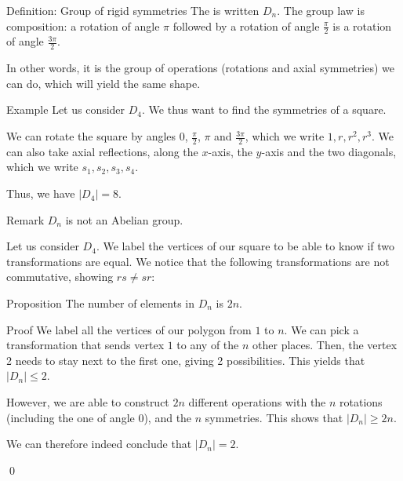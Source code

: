 \documentclass[a4paper]{article}
\begin{document}
\begin{parag}{Definition: Group of rigid symmetries}
    The  is written $D_n$. The group law is composition: a rotation of angle $\pi$ followed by a rotation of angle $\frac{\pi}{2}$ is a rotation of angle $\frac{3\pi}{2}$.

    In other words, it is the group of operations (rotations and axial symmetries) we can do, which will yield the same shape.
\end{parag}

\begin{parag}{Example}
    Let us consider $D_4$. We thus want to find the symmetries of a square.

    We can rotate the square by angles $0$, $\frac{\pi}{2}$, $\pi$ and $\frac{3\pi}{2}$, which we write $1, r, r^2, r^3$. We can also take axial reflections, along the $x$-axis, the $y$-axis and the two diagonals, which we write $s_1, s_2, s_3, s_4$.

    Thus, we have $\left|D_4\right| = 8$.
\end{parag}

\begin{parag}{Remark}
    $D_n$ is not an Abelian group.

    Let us consider $D_4$. We label the vertices of our square to be able to know if two transformations are equal. We notice that the following transformations are not commutative, showing $rs \neq sr$:
\end{parag}

\begin{parag}{Proposition}
    The number of elements in $D_n$ is $2n$.

    \begin{subparag}{Proof}
        We label all the vertices of our polygon from $1$ to $n$. We can pick a transformation that sends vertex $1$ to any of the $n$ other places. Then, the vertex 2 needs to stay next to the first one, giving 2 possibilities. This yields that $\left|D_n\right| \leq 2$.

        However, we are able to construct $2n$ different operations with the $n$ rotations (including the one of angle 0), and the $n$ symmetries. This shows that $\left|D_n\right| \geq 2n$.

        We can therefore indeed conclude that $\left|D_n\right|= 2$.

        \qed
    \end{subparag}
\end{parag}
\end{document}
